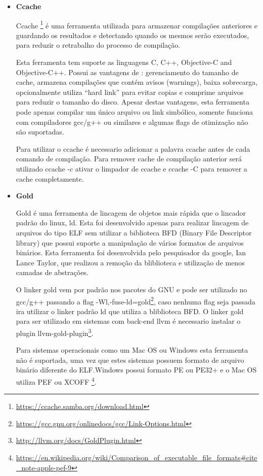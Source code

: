 \begin{itemize}
	\item \textbf{Ccache} \label{ccache}
	
	\subitem Ccache \footnote{\url{https://ccache.samba.org/download.html}} é uma ferramenta utilizada
 para armazenar compilações anteriores e 
guardando os resultados e detectando quando os mesmos serão executados,
 para reduzir o retrabalho do processo de compilação.

    \subitem Esta ferramenta tem suporte as linguagens C, C++, Objective-C and Objective-C++.
 Possui as vantagens de : gerenciamento do tamanho de cache,
 armazena compilações que contém avisos (warnings), baixa sobrecarga,
 opcionalmente utiliza “hard link” para evitar copias e comprime arquivos para
 reduzir o tamanho do disco. Apesar destas vantagens, esta ferramenta pode apenas
 compilar um único arquivo ou link simbólico, somente funciona com compiladores gcc/g++
 ou similares e algumas flags de otimização não são suportadas.

	\subitem Para utilizar o ccache é necessario adicionar a palavra ccache antes de cada
 comando de compilação. Para remover cache de compilação anterior será utilizado
 ccache -c ativar o limpador de ccache e ccache -C para remover a cache completamente.

	\item \textbf{Gold} \label{Gold}

	\subitem Gold é uma ferramenta de lincagem de objetos mais rápida que o lincador padrão do linux,
 ld. Esta foi desenvolvido apenas para realizar lincagem de arquivos do tipo ELF sem utilizar
 a biblioteca BFD (Binary File Descriptor library) que possui suporte a manipulação de vários
 formatos de arquivos binários. Esta ferramenta foi desenvolvida pelo pesquisador da google,
 Ian Lance Taylor, que realizou a remoção da bliblioteca e utilização de menos camadas de abstrações.

	\subitem O linker gold vem por padrão nos pacotes do GNU e pode ser utilizado no gcc/g++ passando a flag
 -Wl,-fuse-ld=gold\footnote{\url{https://gcc.gnu.org/onlinedocs/gcc/Link-Options.html}},
 caso nenhuma flag seja passada ira utilizar o linker padrão ld que utiliza
 a bliblioteca BFD. O linker gold para ser utilizado em sistemas com back-end llvm é necessario
 instalar o plugin llvm-gold-plugin\footnote{\url{http://llvm.org/docs/GoldPlugin.html}}.

	\subitem Para sistemas operacionais como um Mac OS ou Windows esta ferramenta não é suportada, uma vez que
estes sistemas possuem formato de arquivo binário diferente do ELF.Windows possui formato PE ou PE32+ e 
o Mac OS utiliza PEF ou XCOFF
\footnote{\url{https://en.wikipedia.org/wiki/Comparison\_of\_executable\_file\_formats\#cite\_note-apple-pef-9}}.
\end{itemize}

